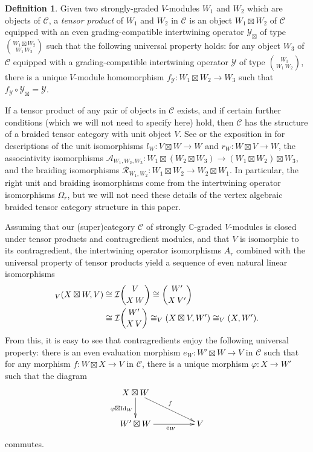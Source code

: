 \documentclass[11pt, reqno]{amsart}
\theoremstyle{definition}\newtheorem{defi}[thm]{Definition}
\theoremstyle{definition}\newtheorem{rem}[thm]{Remark}
\theoremstyle{definition}\newtheorem{exam}[thm]{Example}
\theoremstyle{definition}\newtheorem{assum}[thm]{Assumption}
\newcommand{\cY}{\mathcal{Y}}
\newcommand{\cA}{\mathcal{A}}
\newcommand{\cR}{\mathcal{R}}
\newcommand{\cI}{\mathcal{I}}
\newcommand{\cC}{\mathcal{C}}
\newcommand{\CC}{\mathbb{C}}
\newcommand{\Id}{\mathrm{Id}}
\newcommand{\tens}{\boxtimes}
\let\hom\relax
\DeclareMathOperator{\hom}{Hom}
\begin{document}
\begin{defi}
Given two strongly-graded $V$-modules $W_1$ and $W_2$ which are objects of $\cC$, a \textit{tensor product} of $W_1$ and $W_2$ in $\cC$ is an object $W_1\tens W_2$ of $\cC$ equipped with an even grading-compatible intertwining operator $\cY_\tens$ of type $\binom{W_1\tens W_2}{W_1\,W_2}$ such that the following universal property holds: for any object $W_3$ of $\cC$ equipped with a grading-compatible intertwining operator $\cY$ of type $\binom{W_3}{W_1\,W_2}$, there is a unique $V$-module homomorphism $f_\cY: W_1\tens W_2\rightarrow W_3$ such that $f_\cY\circ\cY_\tens =\cY$.
\end{defi}

If a tensor product of any pair of objects in $\cC$ exists, and if certain further conditions (which we will not need to specify here) hold, then $\cC$ has the structure of a braided tensor category with unit object $V$. See \cite{HLZ8} or the exposition in \cite[Section 3.3]{CKM-exts} for descriptions of the unit isomorphisms $l_W: V\tens W\rightarrow W$ and $r_W: W\tens V\rightarrow W$, the associativity isomorphisms $\cA_{W_1,W_2,W_3}: W_1\tens(W_2\tens W_3)\rightarrow (W_1\tens W_2)\tens W_3$, and the braiding isomorphisms $\cR_{W_1,W_2}: W_1\tens W_2\rightarrow W_2\tens W_1$. In particular, the right unit and braiding isomorphisms come from the intertwining operator isomorphisms $\Omega_r$, but we will not need these details of the vertex algebraic braided tensor category structure in this paper.

Assuming that our (super)category $\cC$ of strongly $\CC$-graded $V$-modules is closed under tensor products and contragredient modules, and that $V$ is isomorphic to its contragredient, the intertwining operator isomorphisms $A_r$ combined with the universal property of tensor products yield a sequence of even natural linear isomorphisms
\begin{align*}
\hom_V(X\tens W,V) & \cong\cI\binom{V}{X\,W}\cong\binom{W'}{X\,V'}\nonumber\\
&\cong\cI\binom{W'}{X\,V}\cong\hom_V(X\tens V,W')\cong\hom_V(X,W').
\end{align*}
From this, it is easy to see that contragredients enjoy the following universal property: there is an even evaluation morphism $e_W: W'\tens W\rightarrow V$ in $\cC$ such that for any morphism $f: W\tens X\rightarrow V$ in $\cC$, there is a unique morphism $\varphi: X\rightarrow W'$ such that the diagram
\begin{equation*}
\xymatrixcolsep{4pc}
\xymatrix{
X\tens W \ar[d]_{\varphi\tens\Id_W} \ar[rd]^{f} & \\
W'\tens W \ar[r]_(.55){e_W} & V \\
}
\end{equation*}
commutes. 
\end{document}
